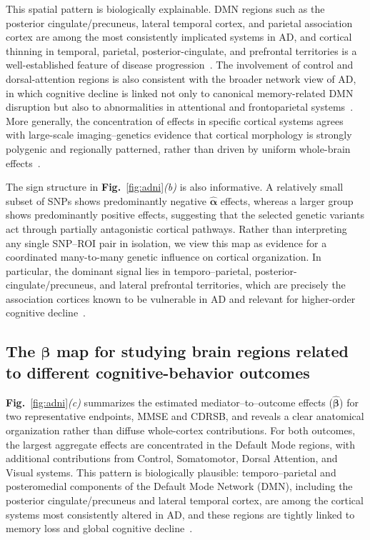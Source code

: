 \documentclass[
  12pt]{article}
\begin{document}
This spatial pattern is biologically explainable.
DMN regions such as the posterior cingulate/precuneus, lateral temporal cortex, and parietal association cortex are among the most consistently implicated systems in AD, and cortical thinning in temporal, parietal, posterior-cingulate, and prefrontal territories is a well-established feature of disease progression~\citep{migliaccio2015mapping,mcevoy2010quantitative}.
The involvement of control and dorsal-attention regions is also consistent with the broader network view of AD, in which cognitive decline is linked not only to canonical memory-related DMN disruption but also to abnormalities in attentional and frontoparietal systems~\citep{katsumi2024greater}.
More generally, the concentration of effects in specific cortical systems agrees with large-scale imaging--genetics evidence that cortical morphology is strongly polygenic and regionally patterned, rather than driven by uniform whole-brain effects~\citep{grasby2020genetic}.

The sign structure in \textbf{Fig.}~\ref{fig:adni}\textit{(b)} is also informative.
A relatively small subset of SNPs shows predominantly negative $\widehat{\bm{\alpha}}$ effects, whereas a larger group shows predominantly positive effects, suggesting that the selected genetic variants act through partially antagonistic cortical pathways.
Rather than interpreting any single SNP--ROI pair in isolation, we view this map as evidence for a coordinated many-to-many genetic influence on cortical organization.
In particular, the dominant signal lies in temporo--parietal, posterior-cingulate/precuneus, and lateral prefrontal territories, which are precisely the association cortices known to be vulnerable in AD and relevant for higher-order cognitive decline~\citep{mcevoy2010quantitative,migliaccio2015mapping}.


\subsection{The \texorpdfstring{$\bm{\beta}$}{beta} map for studying brain regions related to different cognitive-behavior outcomes}

\textbf{Fig.}~\ref{fig:adni}\textit{(c)} summarizes the estimated mediator--to--outcome effects ($\widehat{\bm{\beta}}$) for two representative endpoints, MMSE and CDRSB, and reveals a clear anatomical organization rather than diffuse whole-cortex contributions.
For both outcomes, the largest aggregate effects are concentrated in the Default Mode regions, with additional contributions from Control, Somatomotor, Dorsal Attention, and Visual systems.
This pattern is biologically plausible: temporo--parietal and posteromedial components of the Default Mode Network (DMN), including the posterior cingulate/precuneus and lateral temporal cortex, are among the cortical systems most consistently altered in AD, and these regions are tightly linked to memory loss and global cognitive decline~\citep{mohan2016significance,lee2020posterior,tang2024multimodal}.
\end{document}

